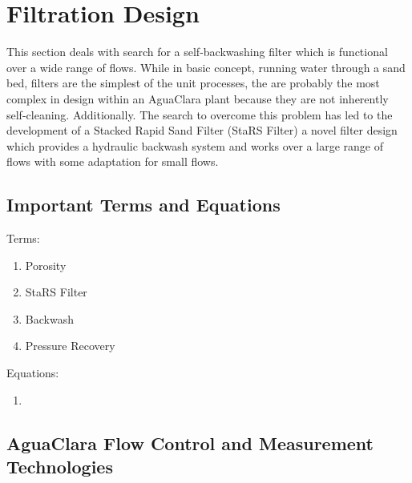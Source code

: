 \documentclass[letterpaper,10pt,english]{sphinxmanual}
\begin{document}
\chapter{Filtration Design}
\label{\detokenize{Filtration/Filtration_Design:filtration-design}}\label{\detokenize{Filtration/Filtration_Design:title-filtration}}\label{\detokenize{Filtration/Filtration_Design::doc}}
This section deals with search for a self-backwashing filter which is functional over a wide range of flows. While in basic concept, running water through a sand bed, filters are the simplest of the unit processes, the are probably the most complex in design within an AguaClara plant because they are not inherently self-cleaning. Additionally. The search to overcome this problem has led to the development of a Stacked Rapid Sand Filter (StaRS Filter) a novel filter design which provides a hydraulic backwash system and works over a large range of flows with some adaptation for small flows.


\section{Important Terms and Equations}
\label{\detokenize{Filtration/Filtration_Design:important-terms-and-equations}}\label{\detokenize{Filtration/Filtration_Design:heading-filtration-terms}}
Terms:
\begin{enumerate}
\item {} 
Porosity

\item {} 
StaRS Filter

\item {} 
Backwash

\item {} 
Pressure Recovery

\end{enumerate}

Equations:
\begin{enumerate}
\item {} 
\end{enumerate}


\section{AguaClara Flow Control and Measurement Technologies}
\label{\detokenize{Filtration/Filtration_Design:aguaclara-flow-control-and-measurement-technologies}}\label{\detokenize{Filtration/Filtration_Design:heading-aguaclara-filtration-technologies}}
\end{document}
